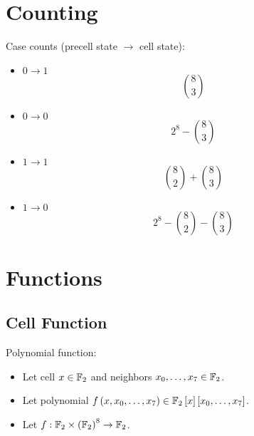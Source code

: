 \documentclass[letterpaper, 14pt]{extarticle}
\begin{document}

\begin{center}
\Large{\mytitle}
\end{center}

\tableofcontents

\begin{flushleft}


\section{Counting}

\begin{remark}
Case counts (precell state $\to$ cell state):
\begin{itemize}
\item $0 \to 1$ $$\binom{8}{3}$$
\item $0 \to 0$ $$2^8 - \binom{8}{3}$$
\item $1 \to 1$ $$\binom{8}{2} + \binom{8}{3}$$
\item $1 \to 0$ $$2^8 - \binom{8}{2} - \binom{8}{3}$$
\end{itemize}
\end{remark}


\section{Functions}


\subsection{Cell Function}

\begin{definition}
Polynomial function:
\begin{itemize}
\item Let cell $x \in \mathbb{F}_2$ and
  neighbors $x_{0}, \ldots, x_{7} \in \mathbb{F}_2$.
\item Let polynomial $f \left( x, x_{0}, \ldots, x_{7} \right) \in \mathbb{F}_2 \left[ x \right] \left[ x_{0}, \ldots, x_{7} \right]$.
\item Let 
  $f: \mathbb{F}_2 \times {\left( \mathbb{F}_2\right)}^8 \to \mathbb{F}_2$.
\end{itemize}
\end{definition}


\end{flushleft}
\end{document}
